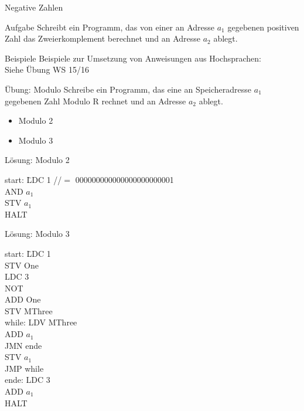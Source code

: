 \begin{frame}{Negative Zahlen}
	\begin{block}{Aufgabe}
		Schreibt ein Programm, das von einer an Adresse $a_1$ gegebenen positiven Zahl das Zweierkomplement berechnet und an Adresse $a_2$ ablegt.
	\end{block}

\end{frame}

\begin{frame}{Beispiele}
	Beispiele zur Umsetzung von Anweisungen aus Hochsprachen:\\
	Siehe Übung WS 15/16
\end{frame}

\begin{frame}{Übung: Modulo}
	Schreibe ein Programm, das eine an Speicheradresse $a_1$ gegebenen Zahl Modulo R rechnet und an Adresse $a_2$ ablegt.
	\begin{itemize}
		\item Modulo 2
		\item Modulo 3
	\end{itemize}
\end{frame}

\begin{frame}{Lösung: Modulo 2}
	\begin{tabbing}
		start:  \= LDC 1 \quad  //$=$ 000000000000000000000001 \\
				\> AND $a_1$ \\
				\> STV $a_1$ \\
				\> HALT
	\end{tabbing}
	
\end{frame}

\begin{frame}{Lösung: Modulo 3}
  \begin{tabbing}
    start:\; \= LDC 1 \\
           \> STV One\\
           \> LDC 3\\
           \> NOT\\
           \> ADD One\\
           \> STV MThree\\
    \medskip
    while: \> LDV MThree\\
           \> ADD $a_1$\\
           \> JMN ende\\
           \> STV $a_1$\\
           \> JMP while\\
    \medskip
    ende:  \> LDC 3\\
           \> ADD $a_1$\\
           \> HALT\\
  \end{tabbing}
\end{frame}
